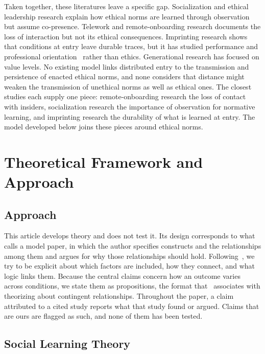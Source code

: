 \documentclass[12pt,a4paper]{article}
\theoremstyle{definition}
\begin{document}
\medskip

Taken together, these literatures leave a specific gap. Socialization and ethical leadership research explain how ethical norms are learned through observation but assume co-presence. Telework and remote-onboarding research documents the loss of interaction but not its ethical consequences. Imprinting research shows that conditions at entry leave durable traces, but it has studied performance and professional orientation~\citep{tilcsik2014imprint,azoulay2017social} rather than ethics. Generational research has focused on value levels. No existing model links distributed entry to the transmission and persistence of enacted ethical norms, and none considers that distance might weaken the transmission of unethical norms as well as ethical ones. The closest studies each supply one piece: remote-onboarding research the loss of contact with insiders, socialization research the importance of observation for normative learning, and imprinting research the durability of what is learned at entry. The model developed below joins these pieces around ethical norms.

\section{Theoretical Framework and Approach}
\subsection{Approach}

This article develops theory and does not test it. Its design corresponds to what~\citet{jaakkola2020designing} calls a model paper, in which the author specifies constructs and the relationships among them and argues for why those relationships should hold. Following~\citet{whetten1989constitutes}, we try to be explicit about which factors are included, how they connect, and what logic links them. Because the central claims concern how an outcome varies across conditions, we state them as propositions, the format that~\citet{cornelissen2017developing} associates with theorizing about contingent relationships. Throughout the paper, a claim attributed to a cited study reports what that study found or argued. Claims that are ours are flagged as such, and none of them has been tested.

\subsection{Social Learning Theory}
\end{document}
